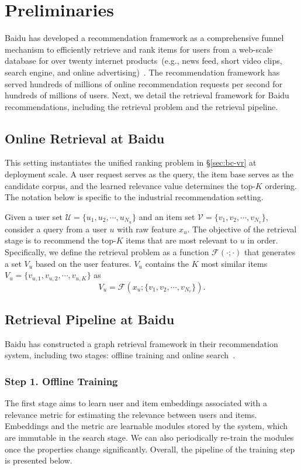 \section{Preliminaries}

Baidu has developed a recommendation framework as a comprehensive funnel mechanism to efficiently retrieve and rank items for users from a web-scale database for over twenty internet products~(e.g., news feed, short video clips, search engine, and online advertising)~\cite{liu2021jizhi}.
The recommendation framework has served hundreds of millions of online recommendation requests per second for hundreds of millions of users.
Next, we detail the retrieval framework for Baidu recommendations, including the retrieval problem and the retrieval pipeline.

\subsection{Online Retrieval at Baidu}
This setting instantiates the unified ranking problem in \S\ref{sec:bc-vr} at deployment scale. A user request serves as the query, the item base serves as the candidate corpus, and the learned relevance value determines the top-$K$ ordering. The notation below is specific to the industrial recommendation setting.

Given a user set $\mathcal{U}=\{u_1,u_2,\cdots,u_{N_u}\}$ and an item set $\mathcal{V}=\{v_1,v_2,\cdots,v_{N_v}\}$, consider a query from a user $u$ with raw feature $x_{u}$. The objective of the retrieval stage is to recommend the top-$K$ items that are most relevant to $u$ in order.
Specifically, we define the retrieval problem as a function $\mathcal{F}(\cdot;\cdot)$ that generates a set $V_{u}$ based on the user features. $V_u$ contains the $K$ most similar items $V_{u} = \{v_{u,1},v_{u,2},\cdots,v_{u,K}\}$ as
\begin{equation}
    V_{u} = \mathcal{F}(x_{u};\{v_1,v_2,\cdots,v_{N_v}\}).
\end{equation}

\subsection{Retrieval Pipeline at Baidu}

Baidu has constructed a graph retrieval framework in their recommendation system, including two stages: offline training and online search~\cite{tan2020fast,chen2022approximate}.

\subsubsection{Step 1. Offline Training}
The first stage aims to learn user and item embeddings associated with a relevance metric for estimating the relevance between users and items.
Embeddings and the metric are learnable modules stored by the system, which are immutable in the search stage.
We can also periodically re-train the modules once the properties change significantly.
Overall, the pipeline of the training step is presented below.

